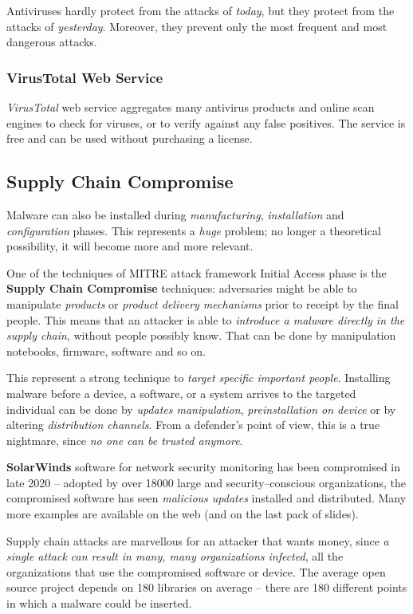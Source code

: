\documentclass[10pt]{extbook}
\begin{document}
Antiviruses hardly protect from the attacks of \emph{today}, but they protect
from the attacks of \emph{yesterday}. Moreover, they prevent only the most
frequent and most dangerous attacks.

\subsubsection{VirusTotal Web Service}

\emph{VirusTotal} web service aggregates many antivirus products and online
scan engines to check for viruses, or to verify against any false positives.
The service is free and can be used without purchasing a license.

\subsection{Supply Chain Compromise}

Malware can also be installed during \emph{manufacturing}, \emph{installation}
and \emph{configuration} phases. This represents a \emph{huge} problem; no
longer a theoretical possibility, it will become more and more relevant.

One of the techniques of MITRE attack framework Initial Access phase is the
\textbf{Supply Chain Compromise} techniques: adversaries might be able to
manipulate \emph{products} or \emph{product delivery mechanisms} prior to
receipt by the final people. This means that an attacker is able to
\emph{introduce a malware directly in the supply chain}, without people
possibly know. That can be done by manipulation notebooks, firmware, software
and so on.

This represent a strong technique to \emph{target specific important people}.
Installing malware before a device, a software, or a system arrives to the
targeted individual can be done by \emph{updates manipulation},
\emph{preinstallation on device} or by altering \emph{distribution channels}.
From a defender's point of view, this is a true nightmare, since \emph{no one
can be trusted anymore}.

\textbf{SolarWinds} software for network security monitoring has been
compromised in late 2020 -- adopted by over 18000 large and security--conscious
organizations, the compromised software has seen \emph{malicious updates}
installed and distributed. Many more examples are available on the web (and on
the last pack of slides).

Supply chain attacks are marvellous for an attacker that wants money, since
\emph{a single attack can result in many, many organizations infected}, all the
organizations that use the compromised software or device. The average open
source project depends on 180 libraries on average -- there are 180 different
points in which a malware could be inserted.
\end{document}
